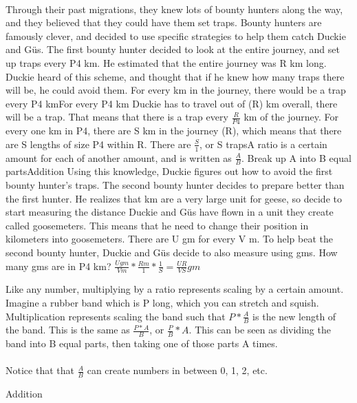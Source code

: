 \documentclass[a4paper,11pt ]{book}
\begin{document}
\paragraph{} Through their past migrations, they knew lots of bounty hunters along the way, and they believed that they could have them set traps. Bounty hunters are famously clever, and decided to use specific strategies to help them catch Duckie and Güs.
\vfill
\pagebreak
{The first bounty hunter decided to look at the entire journey, and set up traps every P4 km. He estimated that the entire journey was R km long. Duckie heard of this scheme, and thought that if he knew how many traps there will be, he could avoid them. For every km in the journey, there would be a trap every P4 km}{For every P4 km Duckie has to travel out of (R) km overall, there will be a trap. That means that there is a trap every $\frac{R}{P4}$ km of the journey. For every one km in P4, there are S km in the journey (R), which means that there are S lengths of size P4 within R. There are $\frac{S}{1}$, or S traps}{A ratio is a certain amount for each of another amount, and is written as $\frac{A}{B}$. Break up A into B equal parts}{Addition}
{Using this knowledge, Duckie figures out how to avoid the first bounty hunter's traps. The second bounty hunter decides to prepare better than the first hunter. He realizes that km are a very large unit for geese, so decide to start measuring the distance Duckie and Güs have flown in a unit they create called goosemeters. This means that he need to change their position in kilometers into goosemeters. There are U gm for every V m. To help beat the second bounty hunter, Duckie and Güs decide to also measure using gms. How many gms are in P4 km?}{
$\frac{Ugm}{Vm}*\frac{Rm}{1}*\frac{1}{S}=\frac{UR}{VS} gm$
}{Like any number, multiplying by a ratio represents scaling by a certain amount. Imagine a rubber band which is P long, which you can stretch and squish. Multiplication represents scaling the band such that $P*\frac{A}{B}$ is the new length of the band. This is the same as $\frac{P*A}{B}$, or $\frac{P}{B}*A$. This can be seen as dividing the band into B equal parts, then taking one of those parts A times. \paragraph{} Notice that that $\frac{A}{B}$ can create numbers in between 0, 1, 2, etc.}{Addition}
\end{document}
